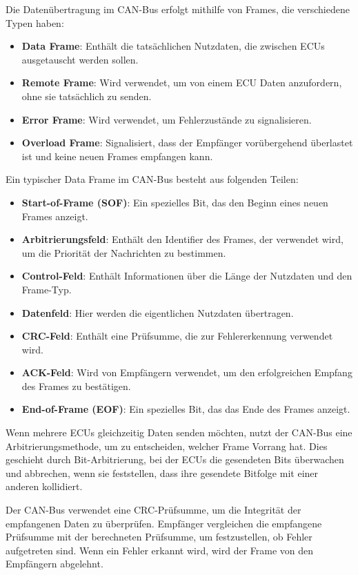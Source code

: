 Die Datenübertragung im \ac{CAN}-Bus erfolgt mithilfe von Frames, die verschiedene Typen haben:
\begin{itemize}
    \item \textbf{Data Frame}: Enthält die tatsächlichen Nutzdaten, die zwischen \acp{ECU} ausgetauscht werden sollen.
    \item \textbf{Remote Frame}: Wird verwendet, um von einem ECU Daten anzufordern, ohne sie tatsächlich zu senden.
    \item \textbf{Error Frame}: Wird verwendet, um Fehlerzustände zu signalisieren.
    \item \textbf{Overload Frame}: Signalisiert, dass der Empfänger vorübergehend überlastet ist und keine neuen Frames
          empfangen kann.
\end{itemize}

Ein typischer Data Frame im \ac{CAN}-Bus besteht aus folgenden Teilen:
\begin{itemize}
    \item \textbf{Start-of-Frame (SOF)}: Ein spezielles Bit, das den Beginn eines neuen Frames anzeigt.
    \item \textbf{Arbitrierungsfeld}: Enthält den Identifier des Frames, der verwendet wird, um die Priorität der
          Nachrichten zu bestimmen.
    \item \textbf{Control-Feld}: Enthält Informationen über die Länge der Nutzdaten und den Frame-Typ.
    \item \textbf{Datenfeld}: Hier werden die eigentlichen Nutzdaten übertragen.
    \item \textbf{CRC-Feld}: Enthält eine Prüfsumme, die zur Fehlererkennung verwendet wird.
    \item \textbf{ACK-Feld}: Wird von Empfängern verwendet, um den erfolgreichen Empfang des Frames zu bestätigen.
    \item \textbf{End-of-Frame (EOF)}: Ein spezielles Bit, das das Ende des Frames anzeigt.
\end{itemize}

Wenn mehrere \acp{ECU} gleichzeitig Daten senden möchten, nutzt der \ac{CAN}-Bus eine Arbitrierungsmethode, um zu entscheiden,
welcher Frame Vorrang hat. Dies geschieht durch Bit-Arbitrierung, bei der \acp{ECU} die gesendeten Bits überwachen und abbrechen,
wenn sie feststellen, dass ihre gesendete Bitfolge mit einer anderen kollidiert.

Der \ac{CAN}-Bus verwendet eine CRC-Prüfsumme, um die Integrität der empfangenen Daten zu überprüfen.
Empfänger vergleichen die empfangene Prüfsumme mit der berechneten Prüfsumme, um festzustellen, ob Fehler aufgetreten sind.
Wenn ein Fehler erkannt wird, wird der Frame von den Empfängern abgelehnt.

